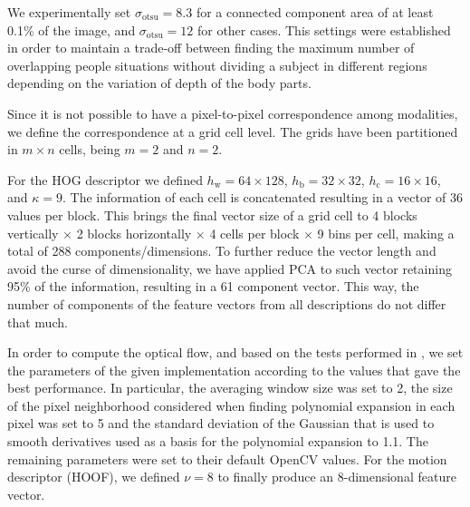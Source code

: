 \documentclass[10pt,twocolumn,letterpaper]{article}
\begin{document}
We experimentally set $\sigma_\text{otsu} = 8.3$ for a connected component area of at least 0.1\% of the image, and  $\sigma_\text{otsu} = 12$ for other cases. This settings were established in order to maintain a trade-off between finding the maximum number of overlapping people situations without dividing a subject in different regions depending on the variation of depth of the body parts.

Since it is not possible to have a pixel-to-pixel correspondence among modalities, we define the correspondence at a grid cell level. The grids have been partitioned in $m \times n$ cells, being $m = 2$ and $n = 2$. 

For the HOG descriptor we defined $h_\text{w} = 64 \times 128$, $h_\text{b} = 32 \times 32$, $h_\text{c}=16 \times 16$, and $\kappa = 9$. The information of each cell is concatenated resulting in a vector of 36 values per block. This brings the final vector size of a grid cell to 4 blocks vertically $\times$ 2 blocks horizontally $\times$ 4 cells per block $\times$ 9 bins per cell, making a total of 288 components/dimensions. To further reduce the vector length and avoid the curse of dimensionality, we have applied PCA to such vector retaining 95\% of the information, resulting in a 61 component vector. This way, the number of components of the feature vectors from all descriptions do not differ that much. 


In order to compute the optical flow, and based on the tests performed in \cite{brkic2013combining}, we set the parameters of the given implementation according to the values that gave the best performance. In particular, the averaging window size was set to 2, the size of the pixel neighborhood considered when finding polynomial expansion in each pixel was set to 5 and the standard deviation of the Gaussian that is used to smooth derivatives used as a basis for the polynomial expansion to 1.1.  The remaining parameters were set to their default OpenCV values. For the motion descriptor (HOOF), we defined $\nu = 8$ to finally produce an 8-dimensional feature vector. 
\end{document}
